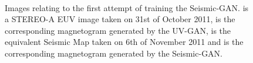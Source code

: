 \documentclass[11pt,a4paper,onecolumn]{report}
\begin{document}
\begin{figure}[t]%
  \centering
  \\%
  \caption[]{Images relating to the first attempt of training the Seismic-GAN.
   is a STEREO-A EUV image taken on 31st of October 2011,
   is the corresponding magnetogram generated by
  the UV-GAN,  is the equivalent Seismic Map taken
  on 6th of November 2011 and
   is the corresponding magnetogram generated by the
  Seismic-GAN.}
  \label{fig:default}
\end{figure}
\end{document}
